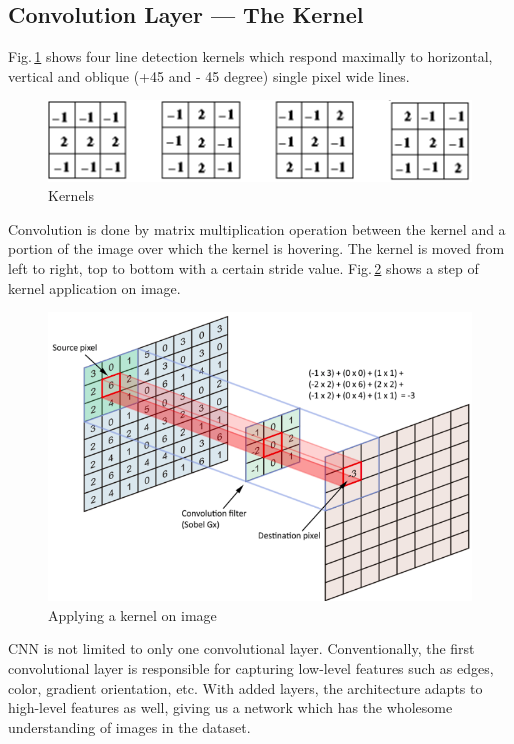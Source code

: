 \subsection{Convolution Layer — The Kernel}
\label{backgournd_cnn}

Fig.\,\ref{kernels} shows four line detection kernels which respond maximally to horizontal, vertical and oblique (+45 and - 45 degree) single pixel wide lines.

\begin{figure}[h]
	\centering
	\includegraphics[scale=0.6]{Figs/kernels.png}
    \caption{Kernels}
    \label{kernels}
\end{figure}

Convolution is done by matrix multiplication operation between the kernel and a portion of the image over which the kernel is hovering. The kernel is moved from left to right, top to bottom with a certain stride value. Fig.\,\ref{convlayer} shows a step of kernel application on image. 

\begin{figure}[h]
	\centering
	\includegraphics[scale=0.4]{Figs/convlayer.png}
    \caption{Applying a kernel on image \citep{towarddata}}
    \label{convlayer}
\end{figure}


CNN is not limited to only one convolutional layer. Conventionally, the first convolutional layer is responsible for capturing low-level features such as edges, color, gradient orientation, etc. With added layers, the architecture adapts to high-level features as well, giving us a network which has the wholesome understanding of images in the dataset.


